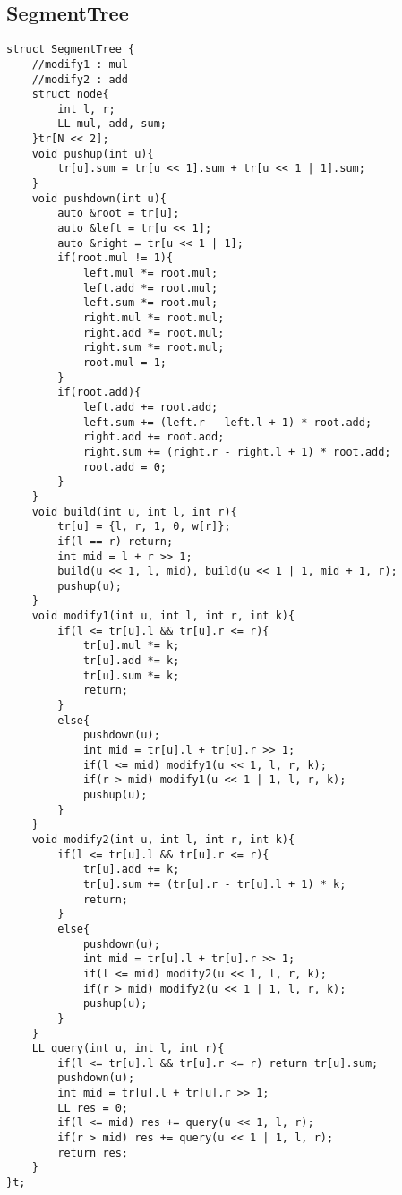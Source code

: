\documentclass[twocolumn,a4]{article}
\begin{document}
\subsection{SegmentTree}
\begin{lstlisting}
struct SegmentTree {
	//modify1 : mul
	//modify2 : add
	struct node{
		int l, r;
		LL mul, add, sum;
	}tr[N << 2];
	void pushup(int u){
		tr[u].sum = tr[u << 1].sum + tr[u << 1 | 1].sum;
	}
	void pushdown(int u){
		auto &root = tr[u];
		auto &left = tr[u << 1];
		auto &right = tr[u << 1 | 1];
		if(root.mul != 1){
			left.mul *= root.mul;
			left.add *= root.mul;
			left.sum *= root.mul;
			right.mul *= root.mul;
			right.add *= root.mul;
			right.sum *= root.mul;
			root.mul = 1;
		}
		if(root.add){
			left.add += root.add;
			left.sum += (left.r - left.l + 1) * root.add;
			right.add += root.add;
			right.sum += (right.r - right.l + 1) * root.add;
			root.add = 0;
		}
	}
	void build(int u, int l, int r){
		tr[u] = {l, r, 1, 0, w[r]};
		if(l == r) return;
		int mid = l + r >> 1;
		build(u << 1, l, mid), build(u << 1 | 1, mid + 1, r);
		pushup(u);
	}
	void modify1(int u, int l, int r, int k){
		if(l <= tr[u].l && tr[u].r <= r){
			tr[u].mul *= k;
			tr[u].add *= k;
			tr[u].sum *= k;
			return;
		}
		else{
			pushdown(u);
			int mid = tr[u].l + tr[u].r >> 1;
			if(l <= mid) modify1(u << 1, l, r, k);
			if(r > mid) modify1(u << 1 | 1, l, r, k);
			pushup(u);
		}
	}
	void modify2(int u, int l, int r, int k){
		if(l <= tr[u].l && tr[u].r <= r){
			tr[u].add += k;
			tr[u].sum += (tr[u].r - tr[u].l + 1) * k;
			return;
		}  
		else{
			pushdown(u);
			int mid = tr[u].l + tr[u].r >> 1;
			if(l <= mid) modify2(u << 1, l, r, k);
			if(r > mid) modify2(u << 1 | 1, l, r, k);
			pushup(u);
		}
	}
	LL query(int u, int l, int r){
		if(l <= tr[u].l && tr[u].r <= r) return tr[u].sum;
		pushdown(u);
		int mid = tr[u].l + tr[u].r >> 1;
		LL res = 0;
		if(l <= mid) res += query(u << 1, l, r);
		if(r > mid) res += query(u << 1 | 1, l, r);
		return res;
	}
}t;
\end{lstlisting}
\end{document}
